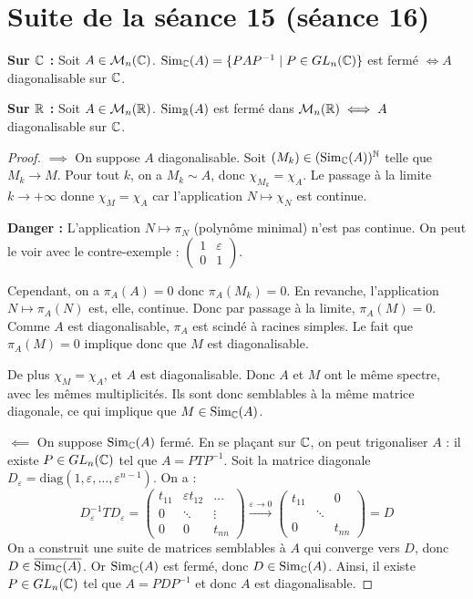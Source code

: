 \section{Suite de la séance 15 (séance 16)}

\begin{theorement}{}
    \textbf{Sur $\mathbb{C}$ :} Soit $A \in \mathcal{M}_n(\mathbb{C})$. $\operatorname{Sim}_{\mathbb{C}}(A) = \{ P A P^{-1} \mid P \in GL_n(\mathbb{C}) \}$ est fermé $\iff A$ diagonalisable sur $\mathbb{C}$.
    
    \lvspace
    \textbf{Sur $\mathbb{R}$ :} Soit $A \in \mathcal{M}_n(\mathbb{R})$. $\operatorname{Sim}_{\mathbb{R}}(A)$ est fermé dans $\mathcal{M}_n(\mathbb{R}) \iff A$ diagonalisable sur $\mathbb{C}$.
\end{theorement}

\begin{proof}
    
    $\implies$ On suppose $A$ diagonalisable. Soit $(M_k) \in (\operatorname{Sim}_{\mathbb{C}}(A))^{\mathbb{N}}$ telle que $M_k \to M$.
    Pour tout $k$, on a $M_k \sim A$, donc $\chi_{M_k} = \chi_A$.
    Le passage à la limite $k \to +\infty$ donne $\chi_M = \chi_A$ car l'application $N \mapsto \chi_N$ est continue.

    \skull \textbf{Danger :} L'application $N \mapsto \pi_N$ (polynôme minimal) n'est pas continue.
    On peut le voir avec le contre-exemple : $\begin{pmatrix} 1 & \varepsilon \\ 0 & 1 \end{pmatrix}$.

    Cependant, on a $\pi_A(A) = 0$ donc $\pi_A(M_k) = 0$. En revanche, l'application $N \mapsto \pi_A(N)$ est, elle, continue.
    Donc par passage à la limite, $\pi_A(M) = 0$.
    Comme $A$ est diagonalisable, $\pi_A$ est scindé à racines simples. Le fait que $\pi_A(M) = 0$ implique donc que $M$ est diagonalisable.

    De plus $\chi_M = \chi_A$, et $A$ est diagonalisable.
    Donc $A$ et $M$ ont le même spectre, avec les mêmes multiplicités.
    Ils sont donc semblables à la même matrice diagonale, ce qui implique que $M \in \operatorname{Sim}_{\mathbb{C}}(A)$.

    \lvspace
    $\impliedby$ On suppose $\operatorname{Sim}_{\mathbb{C}}(A)$ fermé. En se plaçant sur $\mathbb{C}$, on peut trigonaliser $A$ : il existe $P \in GL_n(\mathbb{C})$ tel que $A = P T P^{-1}$.
    Soit la matrice diagonale $D_\varepsilon = \text{diag}(1, \varepsilon, \dots, \varepsilon^{n-1})$.
    On a :
    \[
    D_\varepsilon^{-1} T D_\varepsilon = \begin{pmatrix} t_{11} & \varepsilon t_{12} & \dots \\ 0 & \ddots & \vdots \\ 0 & 0 & t_{nn} \end{pmatrix} \xrightarrow{\varepsilon \to 0} \begin{pmatrix} t_{11} & & 0 \\ & \ddots & \\ 0 & & t_{nn} \end{pmatrix} = D
    \]
    On a construit une suite de matrices semblables à $A$ qui converge vers $D$, donc $D \in \overline{\operatorname{Sim}_{\mathbb{C}}(A)}$. 
    Or $\operatorname{Sim}_{\mathbb{C}}(A)$ est fermé, donc $D \in \operatorname{Sim}_{\mathbb{C}}(A)$.
    Ainsi, il existe $P \in GL_n(\mathbb{C})$ tel que $A = P D P^{-1}$ et donc $A$ est diagonalisable.


\end{proof}
